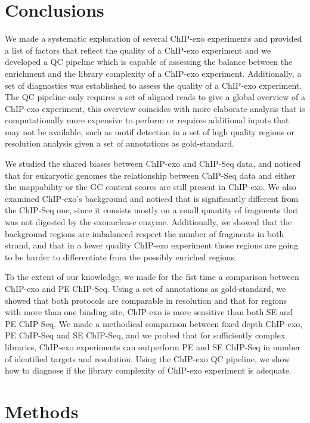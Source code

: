 \documentclass{bmcart}\usepackage[]{graphicx}\usepackage[]{color}
\begin{document}
\section{Conclusions}
\label{sec:conc}

We made a systematic exploration of several ChIP-exo experiments and
provided a list of factors that reflect the quality of a ChIP-exo
experiment and we developed a QC pipeline which is capable of
assessing the balance between the enrichment and the library
complexity of a ChIP-exo experiment. Additionally, a set of
diagnostics was established to assess the quality of a ChIP-exo
experiment. The QC pipeline only requires a set of aligned reads to
give a global overview of a ChIP-exo experiment, this overview
coincides with more elaborate analysis that is computationally more
expensive to perform or requires additional inputs that may not be
available, such as motif detection in a set of high quality regions or
resolution analysis given a set of annotations as gold-standard.

We studied the shared biases between ChIP-exo and ChIP-Seq data, and
noticed that for eukaryotic genomes the relationship between ChIP-Seq
data and either the mappability or the GC content scores are still
present in ChIP-exo. We also examined ChIP-exo's background and
noticed that is significantly different from the ChIP-Seq one, since
it consists mostly on a small quantity of fragments that was not
digested by the exonuclease enzyme. Additionally, we showed that the
background regions are imbalanced respect the number of fragments in
both strand, and that in a lower quality ChIP-exo experiment those
regions are going to be harder to differentiate from the possibly
enriched regions.

To the extent of our knowledge, we made for the fist time a comparison
between ChIP-exo and PE ChIP-Seq. Using a set of annotations as
gold-standard, we showed that both protocols are comparable in
resolution and that for regions with more than one binding site,
ChIP-exo is more sensitive than both SE and PE ChIP-Seq. We made a
methodical comparison between fixed depth ChIP-exo, PE ChIP-Seq and SE
ChIP-Seq, and we probed that for sufficiently complex libraries,
ChIP-exo experiments can outperform PE and SE ChIP-Seq in number of
identified targets and resolution. Using the ChIP-exo QC pipeline, we
show how to diagnose if the library complexity of ChIP-exo experiment
is adequate.


\section{Methods}
\label{sec:methods}
\end{document}
